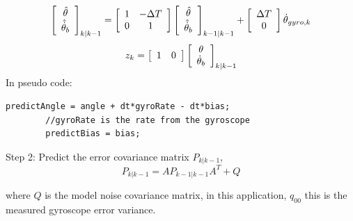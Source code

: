 \documentclass[a4paper]{report}
\begin{document}
		\begin{equation}
		\label{eq:state-equation-detailed}
		\left[
      		\begin{array}{c}
      		\hat{\theta}\\
		\hat{\dot{\theta}}_{b}
      		\end{array} \right]_{k|k-1}
		=
		\left[
		\begin{array}{c c}
		1 & - \Delta T\\
		0 & 1
		\end{array} \right]
		\left[
		\begin{array}{c}
		\hat{\theta}\\
		\hat{\dot{\theta}}_{b}
		\end{array} \right]_{k-1|k-1}
		+
		\left[
		\begin{array}{c}
		\Delta T\\
		0
		\end{array} \right]
		\dot{\theta}_{gyro, k}\\
		\end{equation}
		\begin{equation}
		z_{k}=
		\left[
		\begin{array}{c c}
		1 & 0
		\end{array} \right]
		\left[
		\begin{array}{c}
		\theta\\
		\dot{\theta}_{b}
		\end{array} \right]_{k|k-1}
		\end{equation}
    In pseudo code:
    \begin{lstlisting}[frame=single]
		predictAngle = angle + dt*gyroRate - dt*bias;
		//gyroRate is the rate from the gyroscope
		predictBias = bias;
		\end{lstlisting}

		Step 2: Predict the error covariance matrix $P_{k|k-1}$,
		\begin{equation}
		\label{eq:error-covariance-prediction}
		P_{k|k-1}=AP_{k-1|k-1}A^{T}+Q
		\end{equation}

		where $Q$ is the model noise covariance matrix, in this application, $q_{00}$ this is the measured gyroscope error variance.
\end{document}
